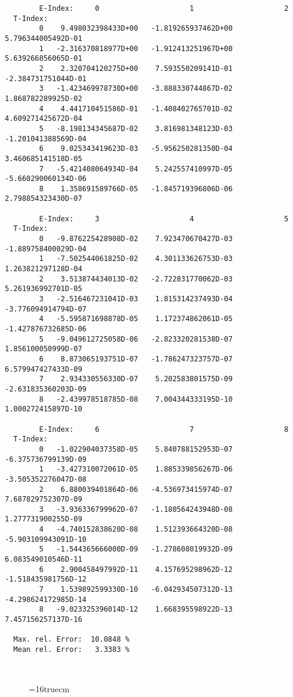 \documentclass[12pt,dvipdfmx]{article}
\begin{document}
\begin{small}\begin{verbatim}
        E-Index:     0                     1                     2
  T-Index:
        0    9.498032398433D+00   -1.819265937462D+00    5.796344005492D-01
        1   -2.316370818977D+00   -1.912413251967D+00    5.639266856065D-01
        2    2.320704120275D+00    7.593550209141D-01   -2.384731751044D-01
        3   -1.423469978730D+00   -3.888330744867D-02    1.868782289925D-02
        4    4.441710451586D-01   -1.408402765701D-02    4.609271425672D-04
        5   -8.198134345687D-02    3.816981348123D-03   -1.201041388569D-04
        6    9.025343419623D-03   -5.956250281350D-04    3.460685141518D-05
        7   -5.421408064934D-04    5.242557410997D-05   -5.660290060134D-06
        8    1.358691589766D-05   -1.845719396806D-06    2.798854323430D-07

        E-Index:     3                     4                     5
  T-Index:
        0   -9.876225428908D-02    7.923470670427D-03   -1.889758400029D-04
        1   -7.502544061825D-02    4.301133626753D-03    1.263821297128D-04
        2    3.513874434013D-02   -2.722831770062D-03    5.261936992701D-05
        3   -2.516467231041D-03    1.815314237493D-04   -3.776094914794D-07
        4   -5.595871698878D-05    1.172374862061D-05   -1.427876732685D-06
        5   -9.049612725058D-06   -2.823320281538D-07    1.856100050999D-07
        6    8.873065193751D-07   -1.786247323757D-07    6.579947427433D-09
        7    2.934330556330D-07    5.202583801575D-09   -2.631835360203D-09
        8   -2.439978518785D-08    7.004344333195D-10    1.000272415897D-10

        E-Index:     6                     7                     8
  T-Index:
        0   -1.022904037358D-05    5.840788152953D-07   -6.375736799139D-09
        1   -3.427310072061D-05    1.885339856267D-06   -3.505352276047D-08
        2    6.880039401864D-06   -4.536973415974D-07    7.687829752307D-09
        3   -3.936336799962D-07   -1.180564243948D-08    1.277731900255D-09
        4   -4.740152838620D-08    1.512393664320D-08   -5.903109943091D-10
        5   -1.544365666000D-09   -1.278608019932D-09    6.083549010546D-11
        6    2.900458497992D-11    4.157695298962D-12   -1.518435981756D-12
        7    1.539892599330D-10   -6.042934507312D-13   -4.298624172985D-14
        8   -9.023325396014D-12    1.668395598922D-13    7.457156257137D-16

  Max. rel. Error:  10.0848 %
  Mean rel. Error:   3.3383 %



\end{verbatim}\end{small}
\begin{figure} \label{2.3.6il1}
\epsfxsize=16truecm
\end{figure}
\newpage
\end{document}
